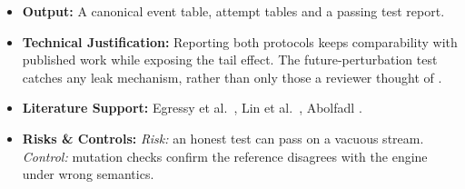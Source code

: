 \documentclass[11pt,a4paper]{article}
\begin{document}
\begin{itemize}[leftmargin=*]
\begin{enumerate}[leftmargin=*]
    \end{enumerate}
    \item \textbf{Output:} A canonical event table, attempt tables and a passing test report.
    \item \textbf{Technical Justification:} Reporting both protocols keeps comparability with published work while exposing the tail effect. The future-perturbation test catches any leak mechanism, rather than only those a reviewer thought of \cite{abolfadl2026kontograph}.
    \item \textbf{Literature Support:} Egressy et al.\ \cite{egressy2024multigraph}, Lin et al.\ \cite{lin2024fraudgt}, Abolfadl \cite{abolfadl2026kontograph}.
    \item \textbf{Risks \& Controls:} \textit{Risk:} an honest test can pass on a vacuous stream. \textit{Control:} mutation checks confirm the reference disagrees with the engine under wrong semantics.
\end{itemize}

\end{document}
